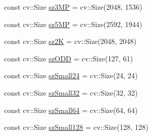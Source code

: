 \begin{DoxyCompactItemize}
\item 
const cv\-::\-Size \hyperlink{namespaceperf_ae3bee08aa583b875fcbc11a757da3ef3}{sz3\-M\-P} = cv\-::\-Size(2048, 1536)
\item 
const cv\-::\-Size \hyperlink{namespaceperf_a6a094d73abcea734bcf1f546ff1abba6}{sz5\-M\-P} = cv\-::\-Size(2592, 1944)
\item 
const cv\-::\-Size \hyperlink{namespaceperf_ae7f6275505429ec52cb19523c5db333a}{sz2\-K} = cv\-::\-Size(2048, 2048)
\item 
const cv\-::\-Size \hyperlink{namespaceperf_af52e6b9008d035b07afca749a825b143}{sz\-O\-D\-D} = cv\-::\-Size(127, 61)
\item 
const cv\-::\-Size \hyperlink{namespaceperf_a7d5bf0103f9ee3afc0be30535b9c63d2}{sz\-Small24} = cv\-::\-Size(24, 24)
\item 
const cv\-::\-Size \hyperlink{namespaceperf_a00d601232dc9acbbd7ac710d2f0f0070}{sz\-Small32} = cv\-::\-Size(32, 32)
\item 
const cv\-::\-Size \hyperlink{namespaceperf_a814dfec6d0d13f821a164e3c562cc1ec}{sz\-Small64} = cv\-::\-Size(64, 64)
\item 
const cv\-::\-Size \hyperlink{namespaceperf_af5e22599b492125ccaba714aa0a729f4}{sz\-Small128} = cv\-::\-Size(128, 128)
\end{DoxyCompactItemize}


